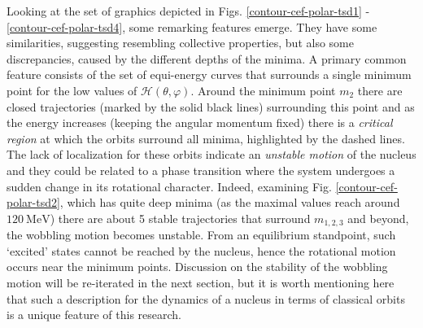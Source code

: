 Looking at the set of graphics depicted in Figs. \ref{contour-cef-polar-tsd1} - \ref{contour-cef-polar-tsd4}, some remarking features emerge. They have some similarities, suggesting resembling collective properties, but also some discrepancies, caused by the different depths of the minima. A primary common feature consists of the set of equi-energy curves that surrounds a single minimum point for the low values of $\mathcal{H}(\theta,\varphi)$. Around the minimum point $m_2$ there are closed trajectories (marked by the solid black lines) surrounding this point and as the energy increases (keeping the angular momentum fixed) there is a \emph{critical region} at which the orbits surround all minima, highlighted by the dashed lines. The lack of localization for these orbits indicate an \emph{unstable motion} of the nucleus and they could be related to a phase transition where the system undergoes a sudden change in its rotational character. Indeed, examining Fig. \ref{contour-cef-polar-tsd2}, which has quite deep minima (as the maximal values reach around $120\ \text{MeV}$) there are about 5 stable trajectories that surround $m_{1,2,3}$ and beyond, the wobbling motion becomes unstable. From an equilibrium standpoint, such `excited' states cannot be reached by the nucleus, hence the rotational motion occurs near the minimum points. Discussion on the stability of the wobbling motion will be re-iterated in the next section, but it is worth mentioning here that such a description for the dynamics of a nucleus in terms of classical orbits is a unique feature of this research.


